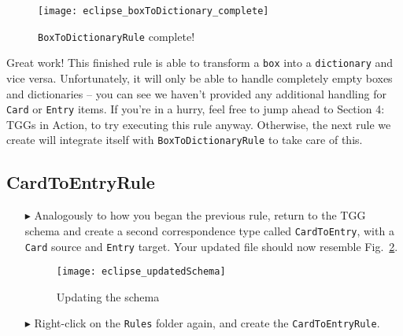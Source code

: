 \begin{figure}[htbp]
\begin{center}
  \texttt{[image: eclipse\_boxToDictionary\_complete]}
  \caption{\texttt{BoxToDictionaryRule} complete!}
  \label{eclipse:allReferences}
\end{center}
\end{figure}

\clearpage

Great work! This finished rule is able to transform a \texttt{box} into a \texttt{dictionary} and vice versa. Unfortunately, it will only be able to handle
completely empty boxes and dictionaries -- you can see we haven't provided any additional handling for \texttt{Card} or \texttt{Entry} items. If you're in a
hurry, feel free to jump ahead to Section 4: TGGs in Action, to try executing this rule anyway. Otherwise, the next rule we create will integrate itself with
\texttt{BoxToDictionaryRule} to take care of this.

\subsection{CardToEntryRule}

\begin{itemize} 

\item[$\blacktriangleright$] Analogously to how you began the previous rule, return to the TGG schema and create a second correspondence type called
\texttt{CardToEntry}, with a \texttt{Card} source and \texttt{Entry} target. Your updated file should now resemble Fig.~\ref{eclipse:updatedSchema}.

\vspace{0.5cm}

\begin{figure}[htbp]
\begin{center}
  \texttt{[image: eclipse\_updatedSchema]}
  \caption{Updating the schema}
  \label{eclipse:updatedSchema}
\end{center}
\end{figure}

\item[$\blacktriangleright$] Right-click on the \texttt{Rules} folder again, and create the \texttt{CardToEntryRule}.

\end{itemize}

